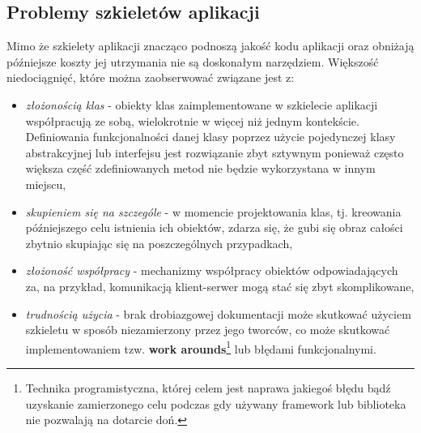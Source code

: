 		\subsection{Problemy szkieletów aplikacji}
			Mimo że szkielety aplikacji znacząco podnoszą jakość kodu aplikacji oraz obniżają późniejsze koszty jej utrzymania nie są doskonałym
		narzędziem. Większość niedociągnięć, które można zaobserwować związane jest z:
		\begin{itemize}
			\item \textit{złożonością klas} - obiekty klas zaimplementowane w szkielecie aplikacji współpracują ze sobą, wielokrotnie w
			więcej niż jednym kontekście. Definiowania funkcjonalności danej klasy poprzez użycie pojedynczej klasy abstrakcyjnej lub
			interfejsu jest rozwiązanie zbyt sztywnym ponieważ często większa część zdefiniowanych metod nie będzie wykorzystana 
			w innym miejscu,
			\item \textit{skupieniem się na szczególe} - w momencie projektowania klas, tj. kreowania późniejszego celu istnienia 
			ich obiektów, zdarza się, że gubi się obraz całości zbytnio skupiając się na poszczególnych przypadkach, 
			\item \textit{złożoność współpracy} - mechanizmy współpracy obiektów odpowiadających za, na przykład, komunikacją klient-serwer
			mogą stać się zbyt skomplikowane,
			\item \textit{trudnością użycia} - brak drobiazgowej dokumentacji może skutkować użyciem szkieletu w sposób niezamierzony przez
			jego tworców, co może skutkować implementowaniem tzw. \textbf{work arounds}\footnote{Technika programistyczna, której celem jest
			naprawa jakiegoś błędu bądź uzyskanie zamierzonego celu podczas gdy używany framework lub biblioteka nie pozwalają na dotarcie
			doń.} lub błędami funkcjonalnymi\cite{framework_design_-_a_role_modeling_approach}. 
		\end{itemize}

